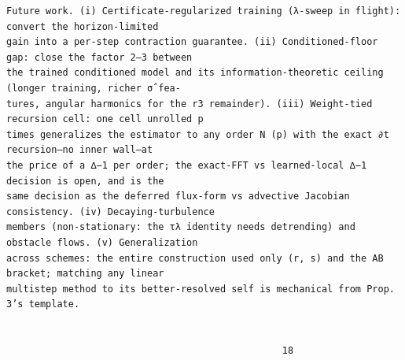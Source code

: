 \documentclass[letterpaper]{article}
\begin{document}
\begin{Verbatim}[fontsize=\fontsize{6.35}{7.15}\selectfont,breaklines=false]
Future work. (i) Certificate-regularized training (λ-sweep in flight): convert the horizon-limited
gain into a per-step contraction guarantee. (ii) Conditioned-floor gap: close the factor 2–3 between
the trained conditioned model and its information-theoretic ceiling (longer training, richer σ̂ fea-
tures, angular harmonics for the r3 remainder). (iii) Weight-tied recursion cell: one cell unrolled p
times generalizes the estimator to any order N (p) with the exact ∂t recursion—no inner wall—at
the price of a ∆−1 per order; the exact-FFT vs learned-local ∆−1 decision is open, and is the
same decision as the deferred flux-form vs advective Jacobian consistency. (iv) Decaying-turbulence
members (non-stationary: the τλ identity needs detrending) and obstacle flows. (v) Generalization
across schemes: the entire construction used only (r, s) and the AB bracket; matching any linear
multistep method to its better-resolved self is mechanical from Prop. 3’s template.


                                                 18
\end{Verbatim}
\newpage
\end{document}
